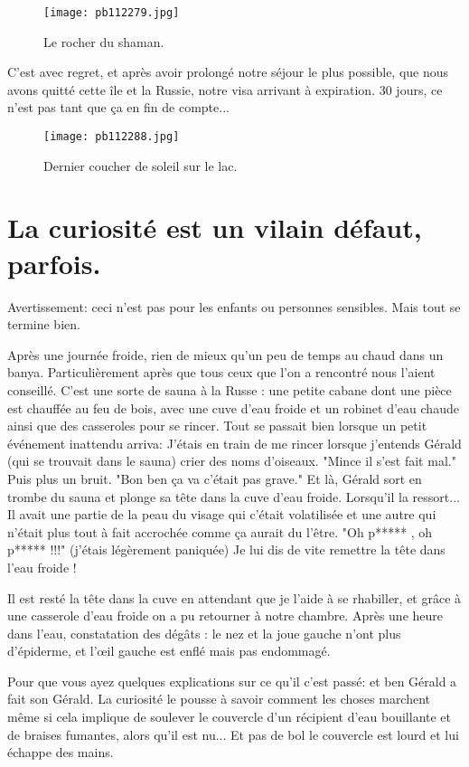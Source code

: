 \documentclass{book}
\begin{document}
\begin{figure}[h]
\centering
\texttt{[image: pb112279.jpg]}
\caption*{ Le rocher du shaman.}
\end{figure}

C'est avec regret, et après avoir prolongé notre séjour le plus possible, que nous avons quitté cette île et la Russie, notre visa arrivant à expiration. 30 jours, ce n'est pas tant que ça en fin de compte...


\begin{figure}[h]
\centering
\texttt{[image: pb112288.jpg]}
\caption*{ Dernier coucher de soleil sur le lac.}
\end{figure}



\chapter{La curiosité est un vilain défaut, parfois.}
Avertissement: ceci n'est pas pour les enfants ou personnes sensibles.
Mais tout se termine bien.

Après une journée froide, rien de mieux qu'un peu de temps au chaud dans un banya. Particulièrement après que tous ceux que l'on a rencontré nous l'aient conseillé.
C'est une sorte de sauna à la Russe : une petite cabane dont une pièce est chauffée au feu de bois, avec une cuve d'eau froide et un robinet d'eau chaude ainsi que des casseroles pour se rincer.
Tout se passait bien lorsque un petit événement inattendu arriva:
J'étais en train de me rincer lorsque j'entends Gérald (qui se trouvait dans le sauna) crier des noms d'oiseaux.
"Mince il s'est fait mal."
Puis plus un bruit.
"Bon ben ça va c'était pas grave."
Et là, Gérald sort en trombe du sauna et plonge sa tête dans la cuve d'eau froide. Lorsqu'il la ressort... Il avait une partie de la peau du visage qui c'était volatilisée et une autre qui n'était plus tout à fait accrochée comme ça aurait du l'être.
"Oh p***** , oh p***** !!!" (j'étais légèrement paniquée) Je lui dis de vite remettre la tête dans l'eau froide !

Il est resté la tête dans la cuve en attendant que je l'aide à se rhabiller, et grâce à une casserole d'eau froide on a pu retourner à notre chambre.
Après une heure dans l'eau, constatation des dégâts : le nez et la joue gauche n'ont plus d'épiderme, et l’œil gauche est enflé mais pas endommagé.

Pour que vous ayez quelques explications sur ce qu'il c'est passé: et ben Gérald a fait son Gérald. La curiosité le pousse à savoir comment les choses marchent même si cela implique de soulever le couvercle d'un récipient d'eau bouillante et de braises fumantes, alors qu'il est nu... Et pas de bol le couvercle est lourd et lui échappe des mains.
\end{document}
